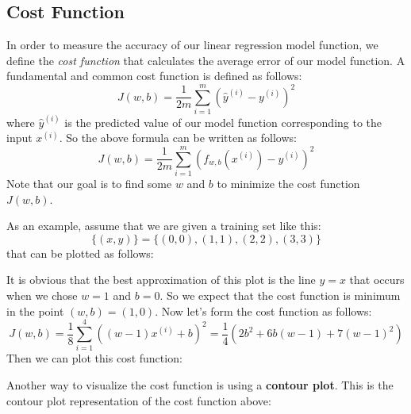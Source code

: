 \documentclass[a4paper, 12pt]{book}
\begin{document}
\subsection{Cost Function}
In order to measure the accuracy of our linear regression model function, we define the \emph{cost function} that calculates the average error of our model function. A fundamental and common cost function is defined as follows: \[J(w,b) = \frac{1}{2m} \sum_{i=1}^{m} (\hat{y}^{(i)} - y^{(i)})^2\] where $\hat{y}^{(i)}$ is the predicted value of our model function corresponding to the input $x^{(i)}$. So the above formula can be written as follows: \[J(w,b) = \frac{1}{2m} \sum_{i=1}^{m} (f_{w,b}(x^{(i)}) - y^{(i)})^2\] Note that our goal is to find some $w$ and $b$ to minimize the cost function $J(w,b)$.

As an example, assume that we are given a training set like this: \[\{(x,y)\} = \{(0,0),(1,1),(2,2),(3,3)\}\] that can be plotted as follows:
\begin{center}
\end{center}
It is obvious that the best approximation of this plot is the line $y = x$ that occurs when we chose $w = 1$ and $b = 0$. So we expect that the cost function is minimum in the point $(w,b) = (1,0)$. Now let's form the cost function as follows: \[J(w,b) = \frac{1}{8} \sum_{i=1}^{4} ((w-1)x^{(i)} + b)^2 = \frac{1}{4} (2 b^2 + 6 b (w - 1) + 7 (w - 1)^2)\] Then we can plot this cost function:
\begin{center}
\end{center}
Another way to visualize the cost function is using a \textbf{contour plot}. This is the contour plot representation of the cost function above:
\begin{center}
\end{center}
\end{document}
